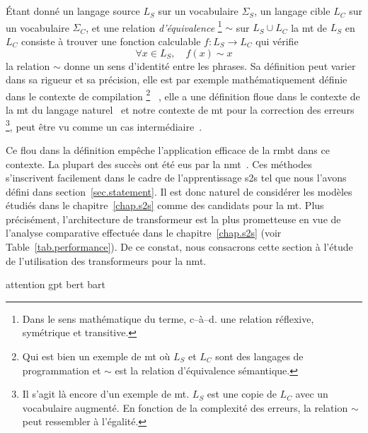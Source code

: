 \section{}

Étant donné un langage source \(L_S\) sur un vocabulaire \(\Sigma_S\),
un langage cible \(L_C\) sur un vocabulaire \(\Sigma_C\),
et une relation \emph{d'équivalence}%
\footnote{Dans le sens mathématique du terme, c--à--d. une relation réflexive, symétrique et transitive.} %
\(\sim\) sur \(L_S \cup L_C\) %
la \gls{mt} de \(L_S\) en \(L_C\) consiste à trouver une fonction calculable \(f : L_S \rightarrow L_C\)
qui vérifie 
\begin{equation}
    \label{eq:mt-equivalence}
    \forall x \in L_S, \quad f(x) \sim x
\end{equation}
la relation \(\sim\) donne un sens d'identité entre les phrases.
Sa définition peut varier dans sa rigueur et sa précision,
elle est par exemple mathématiquement définie dans le contexte de compilation%
\footnote{Qui est bien un exemple de \gls{mt} où \(L_S\) et \(L_C\) sont des langages de programmation
et \(\sim\) est la relation d'équivalence sémantique.}%
~\cite{Hadj_2015},
elle a une définition floue dans le contexte de la \gls{mt} du langage naturel~\cite{routledge}
et notre contexte de \gls{mt} pour la correction des erreurs%
\footnote{%
    Il s'agit là encore d'un exemple de \gls{mt}. \(L_S\) est une copie de \(L_C\) avec un vocabulaire augmenté.
    En fonction de la complexité des erreurs, la relation \(\sim\) peut ressembler à l'égalité.
}, %
peut être vu comme un cas intermédiaire~\cite{Bryant_Yuan_Qorib_Cao_Ng_Briscoe_2022}.

Ce flou dans la définition empêche l'application efficace de la \gls{rmbt} dans ce contexte.
La plupart des succès ont été eus par la \gls{nmt}~\cite{deep-nmt-survey}.
Ces méthodes s'inscrivent facilement dans le cadre de l'apprentissage \gls{s2s} 
tel que nous l'avons défini dans section~\ref{sec.statement}.
Il est donc naturel de considérer les modèles étudiés dans le chapitre~\ref{chap.s2s} 
comme des candidats pour la \gls{mt}.
Plus précisément, l'architecture de transformeur est la plus prometteuse en vue de l'analyse comparative
effectuée dans le chapitre~\ref{chap.s2s} (voir Table~\ref{tab.performance}).
De ce constat, nous consacrons cette section à l'étude de l'utilisation des transformeurs pour la \gls{nmt}.

{attention}
{gpt}
{bert}
{bart}